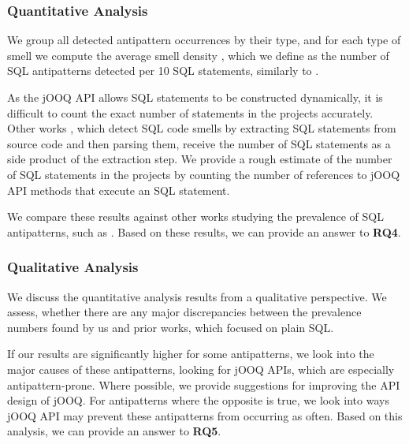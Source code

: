 \documentclass{article}
\begin{document}
\subsubsection{Quantitative Analysis}

We group all detected antipattern occurrences by their type, and for each type of smell we compute the average smell density \cite[p. 190]{DBLP:conf/msr/SharmaFS16}, which we define as the number of SQL antipatterns detected per 10 SQL statements, similarly to \textcite[p. 6]{sharma2018smelly}. 

As the jOOQ API allows SQL statements to be constructed dynamically, it is difficult to count the exact number of statements in the projects accurately. Other works \cites{muse2020prevalence}{sharma2018smelly}, which detect SQL code smells by extracting SQL statements from source code and then parsing them, receive the number of SQL statements as a side product of the extraction step. We provide a rough estimate of the number of SQL statements in the projects by counting the number of references to jOOQ API methods that execute an SQL statement.

We compare these results against other works studying the prevalence of SQL antipatterns, such as \cites{muse2020prevalence}{sharma2018smelly}. Based on these results, we can provide an answer to \textbf{RQ4}.

\subsubsection{Qualitative Analysis}

We discuss the quantitative analysis results from a qualitative perspective. We assess, whether there are any major discrepancies between the prevalence numbers found by us and prior works, which focused on plain SQL. 

If our results are significantly higher for some antipatterns, we look into the major causes of these antipatterns, looking for jOOQ APIs, which are especially antipattern-prone. Where possible, we provide suggestions for improving the API design of jOOQ. For antipatterns where the opposite is true, we look into ways jOOQ API may prevent these antipatterns from occurring as often. Based on this analysis, we can provide an answer to \textbf{RQ5}.

\printbibliography
\end{document}

